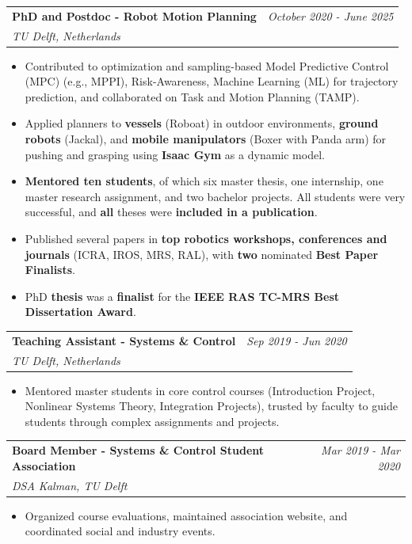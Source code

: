 \documentclass[a4paper,11pt]{article}
\makeatletter
\newcommand{\resumeSubheading}[4]{
\vspace{0.5mm}\item
    \begin{tabular*}{0.98\textwidth}[t]{l@{\extracolsep{\fill}}r}
        \textbf{#1} & \textit{\footnotesize{#4}} \\
        \textit{\footnotesize{#3}} &  \footnotesize{#2}\\
    \end{tabular*}
    \vspace{-2.4mm}
}
\newcommand{\resumeItemListStart}{\begin{justify}\begin{itemize}[leftmargin=3ex, rightmargin=2ex, noitemsep,labelsep=1.2mm,itemsep=0mm]\small}
\newcommand{\resumeItemListEnd}{\end{itemize}\end{justify}\vspace{-2mm}}
\makeatother
\begin{document}
    \resumeSubheading
      {PhD and Postdoc - Robot Motion Planning}{}
      {TU Delft, Netherlands}{October 2020 - June 2025}
        \vspace{-1.5mm}
        \resumeItemListStart
            \item {Contributed to optimization and sampling-based Model Predictive Control (MPC) (e.g., MPPI), Risk-Awareness, Machine Learning (ML) for trajectory prediction, and collaborated on Task and Motion Planning (TAMP).}\vspace{0.5mm}
            \item {Applied planners to \textbf{vessels} (Roboat) in outdoor environments, \textbf{ground robots} (Jackal), and \textbf{mobile manipulators} (Boxer with Panda arm) for pushing and grasping using \textbf{Isaac Gym} as a dynamic model.}\vspace{0.5mm}
            \item {\textbf{Mentored ten students}, of which six master thesis, one internship, one master research assignment, and two bachelor projects. All students were very successful, and \textbf{all} theses were \textbf{included in a publication}.}\vspace{0.5mm}
            \item {Published several papers in \textbf{top robotics workshops, conferences and journals} (ICRA, IROS, MRS, RAL), with \textbf{two} nominated \textbf{Best Paper Finalists}.}
            \item {PhD \textbf{thesis} was a \textbf{finalist} for the \textbf{IEEE RAS TC-MRS Best Dissertation Award}.}
        \resumeItemListEnd

    \resumeSubheading
      {Teaching Assistant - Systems \& Control}{}
      {TU Delft, Netherlands}{Sep 2019 - Jun 2020}
        \vspace{-1.5mm}
      \resumeItemListStart
    \item {Mentored master students in core control courses (Introduction Project, Nonlinear Systems Theory, Integration Projects), trusted by faculty to guide students through complex assignments and projects.}
    \resumeItemListEnd

    \resumeSubheading
      {Board Member - Systems \& Control Student Association}{}
      {DSA Kalman, TU Delft}{Mar 2019 - Mar 2020}
        \vspace{-1.5mm}
      \resumeItemListStart
    \item {Organized course evaluations, maintained association website, and coordinated social and industry events.}
        \resumeItemListEnd
\end{document}
